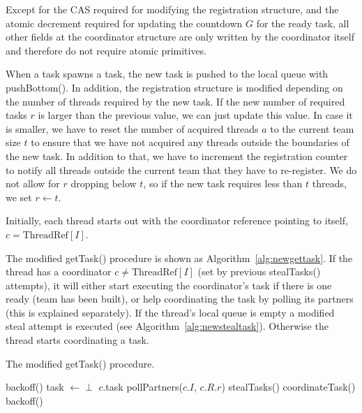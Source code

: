 \documentclass[preprint]{sigplanconf}
\begin{document}
Except for the CAS required for modifying the registration structure,
and the atomic decrement required for updating the countdown $G$ for
the ready task, all other fields at the coordinator structure are only
written by the coordinator itself and therefore do not require atomic
primitives.

When a task spawns a task, the new task is pushed to the local queue
with pushBottom(). In addition, the registration structure is modified
depending on the number of threads required by the new task. If the
new number of required tasks $r$ is larger than the previous value, we
can just update this value. In case it is smaller, we have to reset
the number of acquired threads $a$ to the current team size $t$ to
ensure that we have not acquired any threads outside the boundaries of
the new task. In addition to that, we have to increment the
registration counter to notify all threads outside the current team
that they have to re-register. We do not allow for $r$ dropping below
$t$, so if the new task requires less than $t$ threads, we set $r
\gets t$.

Initially, each thread starts out with the coordinator reference
pointing to itself, $c=\mbox{ThreadRef}[I]$.

The modified getTask() procedure is shown as
Algorithm~\ref{alg:newgettask}.  If the thread has a coordinator $c
\neq \mbox{ThreadRef}[I]$ (set by previous stealTasks() attempts), it
will either start executing the coordinator's task if there is one
ready (team has been built), or help coordinating the task by polling
its partners (this is explained separately).  If the thread's local queue
is empty a modified steal attempt is executed (see
Algorithm~\ref{alg:newstealtask}).  Otherwise the thread starts
coordinating a task.

\begin{algorithm}
\caption{The modified getTask() procedure.}\label{alg:newgettask}
\begin{algorithmic}[1]
	\STATE {}
	\STATE backoff()
\ENDWHILE
\STATE task $\gets\perp$ 
\REPEAT
{}
	\STATE {}
		\STATE {}
		\RETURN $c$.task
	\ELSE
		\STATE pollPartners($c.I$, $c.R.r$)
	\ENDIF
{}
	\STATE stealTasks()
\ELSE
	\STATE coordinateTask()
		\STATE backoff()
	\ENDIF
\ENDIF	
{}
\end{algorithmic}
\end{algorithm}
\end{document}
